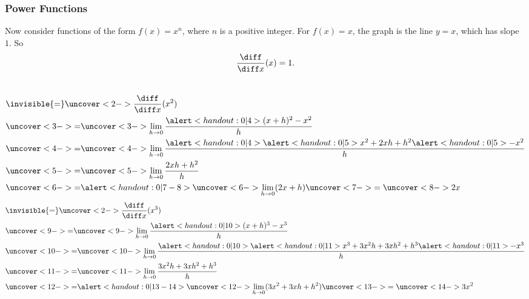 \begin{frame}
\frametitle{Power Functions}
Now consider functions of the form $f(x) = x^n$, where $n$ is a positive integer.  For $f(x) = x$, the graph is the line $y = x$, which has slope $1$.  So 
\[
\frac{\diff}{\diff x} (x) = 1.
\]

%
\begin{columns}[t]
\abovedisplayskip=0pt
\belowdisplayskip=0pt
\begin{align*}
& \invisible{ = } \uncover<2->{\frac{\diff}{\diff x} (x^2)}\\
& \uncover<3->{ = }  %
\uncover<3->{\lim_{h\rightarrow 0}\frac{\alert<handout:0| 4>{(x+h)^2} - x^2}{h}}\\
& \uncover<4->{ = }  %
\uncover<4->{\lim_{h\rightarrow 0}\frac{\alert<handout:0| 4>{\alert<handout:0| 5>{x^2} + 2xh + h^2}  \alert<handout:0| 5>{- x^2}}{h}}\\
& \uncover<5->{ = }  %
\uncover<5->{\lim_{h\rightarrow 0}\frac{2xh + h^2}{h}}\\
& \uncover<6->{ = }  %
\alert<handout:0| 7-8>{\uncover<6->{\lim_{h\rightarrow 0}(2x + h)}\uncover<7->{ = \uncover<8->{2x}}}
\end{align*}
\abovedisplayskip=0pt
\belowdisplayskip=0pt
\begin{align*}
& \invisible{ = } \uncover<2->{\frac{\diff}{\diff x} (x^3)}\\
& \uncover<9->{ = }  %
\uncover<9->{\lim_{h\rightarrow 0}\frac{\alert<handout:0| 10>{(x+h)^3} - x^3}{h}}\\
& \uncover<10->{ = }  %
\uncover<10->{\lim_{h\rightarrow 0}\frac{\alert<handout:0| 10>{\alert<handout:0| 11>{x^3} + 3x^2h + 3xh^2 + h^3}  \alert<handout:0| 11>{- x^3}}{h}}\\
& \uncover<11->{ = }  %
\uncover<11->{\lim_{h\rightarrow 0}\frac{3x^2h + 3xh^2 + h^3}{h}}\\
& \uncover<12->{ = }  %
\alert<handout:0| 13-14>{\uncover<12->{\lim_{h\rightarrow 0}(3x^2 + 3xh + h^2)}\uncover<13->{ = \uncover<14->{3x^2}}}
\end{align*}
\end{columns}
\end{frame}
